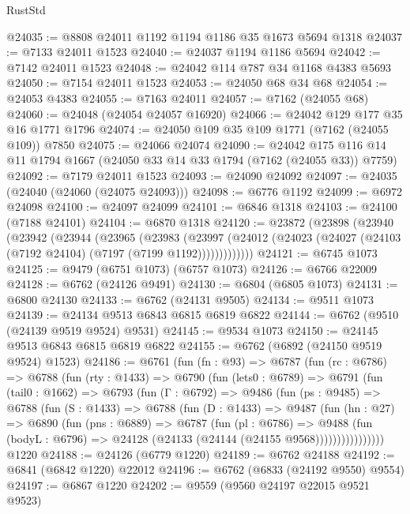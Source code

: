 \begin{lexlean}{RustStd}
\begin{coremodule}
@24035 := @8808 @24011 @1192 @1194 @1186 @35 @1673 @5694 @1318
@24037 := @7133 @24011 @1523
@24040 := @24037 @1194 @1186 @5694
@24042 := @7142 @24011 @1523
@24048 := @24042 @114 @787 @34 @1168 @4383 @5693
@24050 := @7154 @24011 @1523
@24053 := @24050 @68 @34 @68
@24054 := @24053 @4383
@24055 := @7163 @24011
@24057 := @7162 (@24055 @68)
@24060 := @24048 (@24054 @24057 @16920)
@24066 := @24042 @129 @177 @35 @16 @1771 @1796
@24074 := @24050 @109 @35 @109 @1771 (@7162 (@24055 @109)) @7850
@24075 := @24066 @24074
@24090 := @24042 @175 @116 @14 @11 @1794 @1667 (@24050 @33 @14 @33 @1794 (@7162 (@24055 @33)) @7759)
@24092 := @7179 @24011 @1523
@24093 := @24090 @24092
@24097 := @24035 (@24040 (@24060 (@24075 @24093)))
@24098 := @6776 @1192
@24099 := @6972 @24098
@24100 := @24097 @24099
@24101 := @6846 @1318
@24103 := @24100 (@7188 @24101)
@24104 := @6870 @1318
@24120 := @23872
    (@23898
      (@23940
        (@23942
          (@23944
            (@23965
              (@23983
                (@23997
                  (@24012 (@24023 (@24027 (@24103 (@7192 @24104) (@7197 (@7199 @1192)))))))))))))
@24121 := @6745 @1073
@24125 := @9479 (@6751 @1073) (@6757 @1073)
@24126 := @6766 @22009
@24128 := @6762 (@24126 @9491)
@24130 := @6804 (@6805 @1073)
@24131 := @6800 @24130
@24133 := @6762 (@24131 @9505)
@24134 := @9511 @1073
@24139 := @24134 @9513 @6843 @6815 @6819 @6822
@24144 := @6762 (@9510 (@24139 @9519 @9524) @9531)
@24145 := @9534 @1073
@24150 := @24145 @9513 @6843 @6815 @6819 @6822
@24155 := @6762 (@6892 (@24150 @9519 @9524) @1523)
@24186 := @6761
    (fun (fn : @93) =>
    @6787
      (fun (rc : @6786) =>
      @6788
        (fun (rty : @1433) =>
        @6790
          (fun (lets0 : @6789) =>
          @6791
            (fun (tail0 : @1662) =>
            @6793
              (fun (Γ : @6792) =>
              @9486
                (fun (ps : @9485) =>
                @6788
                  (fun (S : @1433) =>
                  @6788
                    (fun (D : @1433) =>
                    @9487
                      (fun (hn : @27) =>
                      @6890
                        (fun (pns : @6889) =>
                        @6787
                          (fun (pl : @6786) =>
                          @9488
                            (fun (bodyL : @6796) =>
                            @24128 (@24133 (@24144 (@24155 @9568))))))))))))))))
    @1220
@24188 := @24126 (@6779 @1220)
@24189 := @6762 @24188
@24192 := @6841 (@6842 @1220) @22012
@24196 := @6762 (@6833 (@24192 @9550) @9554)
@24197 := @6867 @1220
@24202 := @9559 (@9560 @24197 @22015 @9521 @9523)

\end{coremodule}
\end{lexlean}
